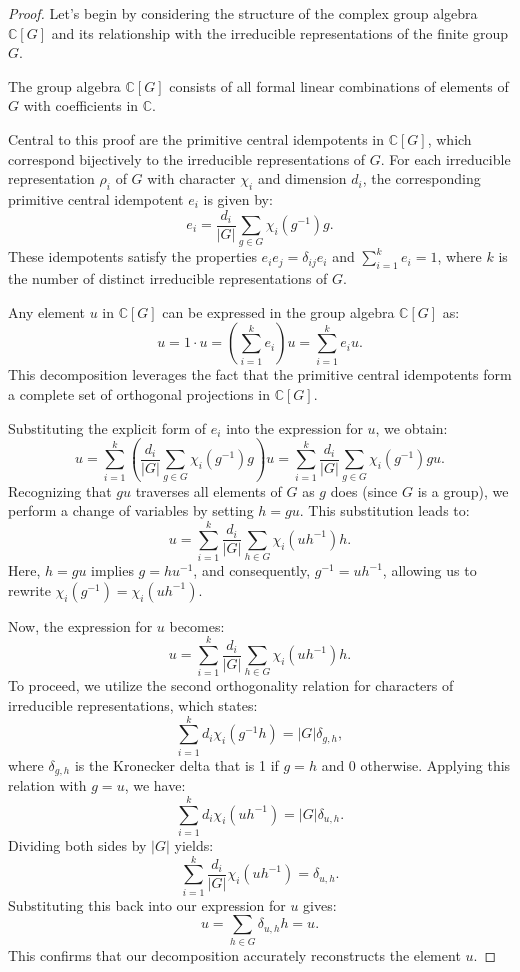 \documentclass[11pt,a4paper]{article}
\begin{document}
\begin{proof}
Let's begin by considering the structure of the complex group algebra \( \mathbb{C}[G] \) and its relationship with the irreducible representations of the finite group \( G \).

The group algebra \( \mathbb{C}[G] \) consists of all formal linear combinations of elements of \( G \) with coefficients in \( \mathbb{C} \).

Central to this proof are the primitive central idempotents in \( \mathbb{C}[G] \), which correspond bijectively to the irreducible representations of \( G \). For each irreducible representation \( \rho_i \) of \( G \) with character \( \chi_i \) and dimension \( d_i \), the corresponding primitive central idempotent \( e_i \) is given by:
\[
e_i = \frac{d_i}{|G|} \sum_{g \in G} \chi_i(g^{-1}) g.
\]
These idempotents satisfy the properties \( e_i e_j = \delta_{ij} e_i \) and \( \sum_{i=1}^k e_i = 1 \), where \( k \) is the number of distinct irreducible representations of \( G \).

Any element \( u \) in \( \mathbb{C}[G] \) can be expressed in the group algebra \( \mathbb{C}[G] \) as:
\[
u = 1 \cdot u = \left( \sum_{i=1}^k e_i \right) u = \sum_{i=1}^k e_i u.
\]
This decomposition leverages the fact that the primitive central idempotents form a complete set of orthogonal projections in \( \mathbb{C}[G] \).

Substituting the explicit form of \( e_i \) into the expression for \( u \), we obtain:
\[
u = \sum_{i=1}^k \left( \frac{d_i}{|G|} \sum_{g \in G} \chi_i(g^{-1}) g \right) u = \sum_{i=1}^k \frac{d_i}{|G|} \sum_{g \in G} \chi_i(g^{-1}) g u.
\]
Recognizing that \( g u \) traverses all elements of \( G \) as \( g \) does (since \( G \) is a group), we perform a change of variables by setting \( h = g u \). This substitution leads to:
\[
u = \sum_{i=1}^k \frac{d_i}{|G|} \sum_{h \in G} \chi_i(u h^{-1}) h.
\]
Here, \( h = g u \) implies \( g = h u^{-1} \), and consequently, \( g^{-1} = u h^{-1} \), allowing us to rewrite \( \chi_i(g^{-1}) = \chi_i(u h^{-1}) \).

Now, the expression for \( u \) becomes:
\[
u = \sum_{i=1}^k \frac{d_i}{|G|} \sum_{h \in G} \chi_i(u h^{-1}) h.
\]
To proceed, we utilize the second orthogonality relation for characters of irreducible representations, which states:
\[
\sum_{i=1}^k d_i \chi_i(g^{-1} h) = |G| \delta_{g,h},
\]
where \( \delta_{g,h} \) is the Kronecker delta that is 1 if \( g = h \) and 0 otherwise. Applying this relation with \( g = u \), we have:
\[
\sum_{i=1}^k d_i \chi_i(u h^{-1}) = |G| \delta_{u,h}.
\]
Dividing both sides by \( |G| \) yields:
\[
\sum_{i=1}^k \frac{d_i}{|G|} \chi_i(u h^{-1}) = \delta_{u,h}.
\]
Substituting this back into our expression for \( u \) gives:
\[
u = \sum_{h \in G} \delta_{u,h} h = u.
\]
This confirms that our decomposition accurately reconstructs the element \( u \).
\end{proof}
\end{document}
